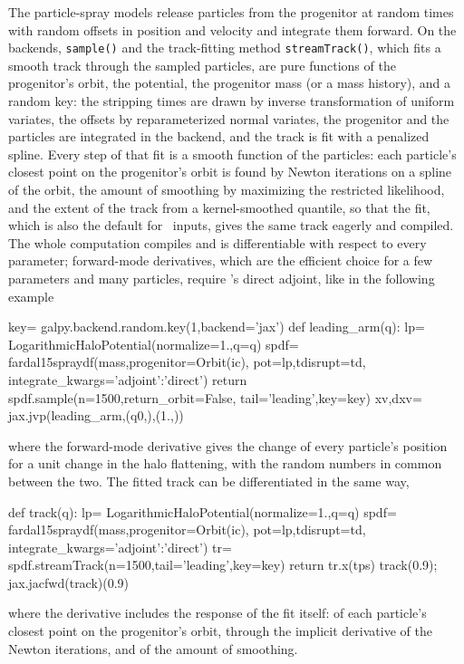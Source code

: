 The particle-spray models release particles from the progenitor at
random times with random offsets in position and velocity and integrate
them forward. On the backends, \texttt{sample()} and the track-fitting
method \texttt{streamTrack()}, which fits a smooth track through the
sampled particles, are pure functions of the progenitor's
orbit, the potential, the progenitor mass (or a mass history), and a
random key: the stripping times are drawn by inverse transformation of
uniform variates, the offsets by reparameterized normal variates, the
progenitor and the particles are integrated in the backend, and the
track is fit with a penalized spline. Every step of that fit is a smooth
function of the particles: each particle's closest point on the
progenitor's orbit is found by Newton iterations on a spline of the
orbit, the amount of smoothing by maximizing the restricted likelihood,
and the extent of the track from a kernel-smoothed quantile, so that the
fit, which is also the default for \numpy\ inputs, gives the same track
eagerly and compiled. The whole computation compiles
and is differentiable with respect to every parameter; forward-mode
derivatives, which are the efficient choice for a few parameters and
many particles, require \diffrax's direct adjoint, like in the following example
\begin{code}
key= galpy.backend.random.key(1,backend='jax')
def leading_arm(q):
    lp= LogarithmicHaloPotential(normalize=1.,q=q)
    spdf= fardal15spraydf(mass,progenitor=Orbit(ic),
        pot=lp,tdisrupt=td,
        integrate_kwargs={'adjoint':'direct'})
    return spdf.sample(n=1500,return_orbit=False,
                       tail='leading',key=key)
xv,dxv= jax.jvp(leading_arm,(q0,),(1.,))
\end{code}
where the forward-mode derivative gives the change of every particle's
position for a unit change in the halo flattening, with the random
numbers in common between the two. The fitted track can be
differentiated in the same way,
\begin{code}
def track(q):
    lp= LogarithmicHaloPotential(normalize=1.,q=q)
    spdf= fardal15spraydf(mass,progenitor=Orbit(ic),
        pot=lp,tdisrupt=td,
        integrate_kwargs={'adjoint':'direct'})
    tr= spdf.streamTrack(n=1500,tail='leading',key=key)
    return tr.x(tps)
track(0.9); jax.jacfwd(track)(0.9)
\end{code}
where the derivative includes the response of the fit itself: of each
particle's closest point on the progenitor's orbit, through the implicit
derivative of the Newton iterations, and of the amount of smoothing.
